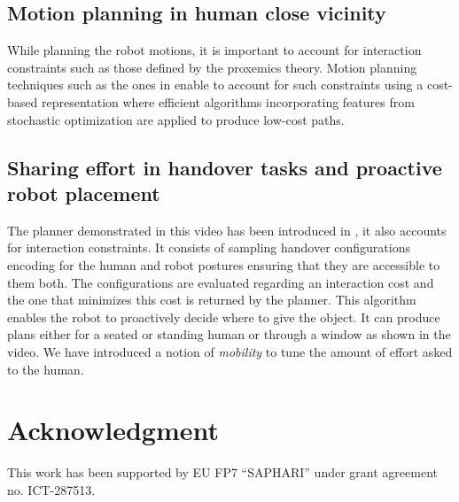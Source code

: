 \documentclass[conference]{IEEEtran}
\begin{document}
\subsection{Motion planning in human close vicinity}

While planning the robot motions, it is important to account for interaction constraints  such as those defined by the proxemics theory. Motion planning techniques such as the ones in \cite{Mainprice:11}  enable to
account for such constraints using a cost-based representation where efficient algorithms incorporating features from stochastic
optimization are applied to produce low-cost paths. 

\subsection{Sharing effort in handover tasks and proactive robot placement}

The planner demonstrated in this video has been introduced in \cite{Mainprice:12}, it also accounts for interaction constraints. It consists of sampling handover configurations encoding for the human and robot postures ensuring that they are accessible to them both. The configurations are evaluated regarding an interaction cost and the one that minimizes this cost is returned by the planner. This algorithm enables the robot to proactively decide where to give the object. It can produce plans either for a seated or standing human or through a window as shown in the video. 
We have introduced a notion of \textit{mobility} to tune the amount of effort asked to the human. 

\section*{Acknowledgment}

This work has been supported by EU FP7 ``SAPHARI'' under grant agreement no. ICT-287513.




\end{document}
